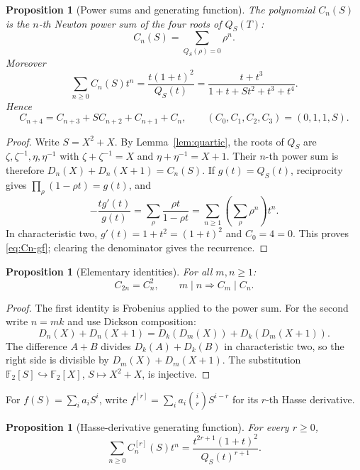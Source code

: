 \documentclass[a4paper]{article}
\newtheorem{proposition}[theorem]{Proposition}
\newcommand{\F}{\mathbb{F}}
\begin{document}
\begin{proposition}[Power sums and generating function]
\label{prop:Cn-powersum}
	The polynomial $C_n(S)$ is the $n$-th Newton power sum of the four roots
	of $Q_S(T)$:
	\[
		C_n(S)=\sum_{Q_S(\rho)=0}\rho^n.
	\]
	Moreover
	\begin{equation}\label{eq:Cn-gf}
		\sum_{n\geq0}C_n(S)t^n
		=\frac{t(1+t)^2}{Q_S(t)}
		=\frac{t+t^3}{1+t+St^2+t^3+t^4}.
	\end{equation}
	Hence
	\[
		C_{n+4}=C_{n+3}+S C_{n+2}+C_{n+1}+C_n,
		\qquad
		(C_0,C_1,C_2,C_3)=(0,1,1,S).
	\]
\end{proposition}

\begin{proof}
	Write $S=X^2+X$.  By Lemma~\ref{lem:quartic}, the roots of $Q_S$ are
	$\zeta,\zeta^{-1},\eta,\eta^{-1}$ with
	$\zeta+\zeta^{-1}=X$ and $\eta+\eta^{-1}=X+1$.  Their $n$-th power
	sum is therefore $D_n(X)+D_n(X+1)=C_n(S)$.
	If $g(t)=Q_S(t)$, reciprocity gives
	$\prod_\rho(1-\rho t)=g(t)$, and
	\[
		-\frac{t g'(t)}{g(t)}
		=\sum_{\rho}\frac{\rho t}{1-\rho t}
		=\sum_{n\geq1}\left(\sum_\rho\rho^n\right)t^n.
	\]
	In characteristic two, $g'(t)=1+t^2=(1+t)^2$ and $C_0=4=0$.
	This proves \eqref{eq:Cn-gf}; clearing the denominator gives the
	recurrence.
\end{proof}

\begin{proposition}[Elementary identities]\label{prop:Cn-identities}
	For all $m,n\geq1$:
	\[
		C_{2n}=C_n^2,
		\qquad
		m\mid n\Longrightarrow C_m\mid C_n.
	\]
\end{proposition}

\begin{proof}
	The first identity is Frobenius applied to the power sum.  For the
	second write $n=mk$ and use Dickson composition:
	\[
		D_n(X)+D_n(X+1)
		=D_k(D_m(X))+D_k(D_m(X+1)).
	\]
	The difference $A+B$ divides $D_k(A)+D_k(B)$ in characteristic two,
	so the right side is divisible by
	$D_m(X)+D_m(X+1)$.  The substitution
	$\F_2[S]\hookrightarrow\F_2[X]$, $S\mapsto X^2+X$, is injective.
\end{proof}

For $f(S)=\sum_i a_iS^i$, write
$f^{[r]}=\sum_i a_i\binom{i}{r}S^{i-r}$ for its $r$-th Hasse derivative.

\begin{proposition}[Hasse-derivative generating function]
\label{prop:Cn-hasse}
	For every $r\geq0$,
	\begin{equation}\label{eq:Cn-hasse}
		\sum_{n\geq0}C_n^{[r]}(S)t^n
		=\frac{t^{2r+1}(1+t)^2}{Q_S(t)^{r+1}}.
	\end{equation}
\end{proposition}
\end{document}

